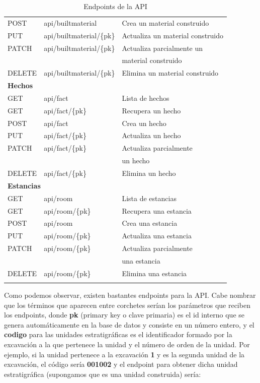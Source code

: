 \begin{longtable}[H]{|l|l|l|}
    POST & api/builtmaterial & Crea un material construido \\
    PUT & api/builtmaterial/\{pk\} & Actualiza un material construido \\
    PATCH & api/builtmaterial/\{pk\} & Actualiza parcialmente un \\
    &  & material construido \\
    DELETE & api/builtmaterial/\{pk\} & Elimina un material construido \\
    \hline\hline
    \multicolumn{3}{|l|}{\textbf{Hechos}} \\
    \hline
    GET & api/fact & Lista de hechos \\
    GET & api/fact/\{pk\} & Recupera un hecho \\
    POST & api/fact & Crea un hecho \\
    PUT & api/fact/\{pk\} & Actualiza un hecho \\
    PATCH & api/fact/\{pk\} & Actualiza parcialmente \\
    &  & un hecho \\
    DELETE & api/fact/\{pk\} & Elimina un hecho \\
    \hline\hline
    \multicolumn{3}{|l|}{\textbf{Estancias}} \\
    \hline
    GET & api/room & Lista de estancias \\
    GET & api/room/\{pk\} & Recupera una estancia \\
    POST & api/room & Crea una estancia \\
    PUT & api/room/\{pk\} & Actualiza una estancia \\
    PATCH & api/room/\{pk\} & Actualiza parcialmente \\
    &  & una estancia \\
    DELETE & api/room/\{pk\} & Elimina una estancia \\
    \hline

    \caption{Endpoints de la API}
    \label{tab:endpoints}
\end{longtable}

Como podemos observar, existen bastantes endpoints para la API. Cabe nombrar que los
términos que aparecen entre corchetes serían los parámetros que reciben los endpoints,
donde \textbf{pk} (primary key o clave primaria) es el id interno que se genera
automáticamente en la base de datos y consiste en un número entero, y el \textbf{codigo}
para las unidades estratigráficas es el identificador formado por la excavación a la
que pertenece la unidad y el número de orden de la unidad. Por ejemplo, si la unidad
pertenece a la excavación \textbf{1} y es la segunda unidad de la excavación, el código
sería \textbf{001002} y el endpoint para obtener dicha unidad estratigráfica (supongamos
que es una unidad construida) sería:

